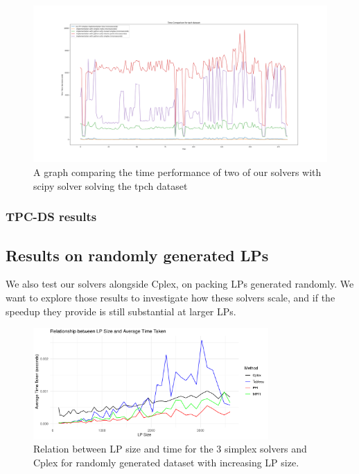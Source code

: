 \begin{figure}[p]
    \begin{adjustbox}{width=\paperwidth,center}
        \includegraphics[width=\paperwidth]{figures/all_scify_mpfi_pfi.png}
    \end{adjustbox}
    \caption{A graph comparing the time performance of two of
        our solvers with scipy solver solving the tpch dataset}
    \label{fig:all_time_tpch}
\end{figure}




\subsubsection{TPC-DS results}

\subsection{Results on randomly generated LPs}
We also test our solvers alongside Cplex, on packing LPs generated randomly. We want to 
explore those results to investigate how these solvers scale, and if the speedup
they provide is still substantial at larger LPs.


\begin{figure}[!htb]
    \centering
    \includegraphics[width=0.8\textwidth]{figures/time_vs_size_random.pdf}
    \caption{Relation between LP size and time for the 3 simplex solvers and Cplex for randomly generated
    dataset with increasing LP size.}
    \label{fig:time_vs_size_random}
\end{figure}


